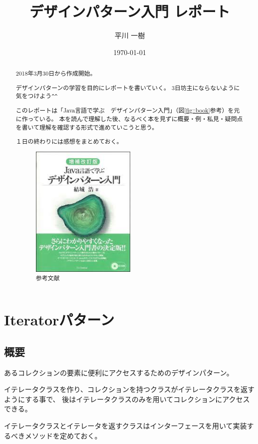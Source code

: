 \documentclass[11pt]{jsarticle}
\title{デザインパターン入門 レポート}
\author{平川 一樹}
\date{\today}
\begin{document}
	\maketitle
	
	\begin{abstract}
		2018年3月30日から作成開始。
		
		デザインパターンの学習を目的にレポートを書いていく。
		3日坊主にならないように気をつけよう\verb|^^|
		
		このレポートは「Java言語で学ぶ　デザインパターン入門」（図\ref{fig::book}参考）を元に作っている。
		本を読んで理解した後、なるべく本を見ずに概要・例・私見・疑問点を書いて理解を確認する形式で進めていこうと思う。
		
		１日の終わりには感想をまとめておく。
		\begin{figure}[htbp]
			\centering
			\includegraphics[width = 5cm, bb = 0 0 199 253]{book.jpg}
			\caption{参考文献}\label{fig::book}
		\end{figure}
	\end{abstract}
	
	\clearpage
	\tableofcontents
	\clearpage
	
	\section{Iteratorパターン}
	\subsection{概要}
		あるコレクションの要素に便利にアクセスするためのデザインパターン。
		
		イテレータクラスを作り、コレクションを持つクラスがイテレータクラスを返すようにする事で、
		後はイテレータクラスのみを用いてコレクションにアクセスできる。
		
		イテレータクラスとイテレータを返すクラスはインターフェースを用いて実装するべきメソッドを定めておく。
\end{document}
